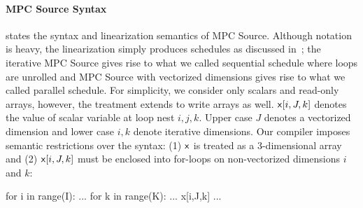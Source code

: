 \paragraph{MPC Source Syntax}

 states the syntax and linearization semantics of MPC Source. 
Although notation is heavy, the linearization simply produces schedules as discussed in~; 
the iterative MPC Source gives rise to what we called sequential schedule where loops are unrolled 
and MPC Source with vectorized dimensions gives rise to what we called parallel schedule. 
For simplicity, we consider only scalars and read-only arrays, however, the treatment extends to write arrays as well.
${\sf {x}}[i,J,k]$ denotes the value of scalar variable \x{} at loop nest $i,j,k$. 
Upper case $J$ denotes a vectorized dimension and lower case $i,k$ denote iterative dimensions. Our compiler imposes 
semantic restrictions over the syntax: (1) ${\sf {x}}$ is treated as a 3-dimensional array and (2) ${\sf {x}}[i,J,k]$ must be enclosed
into for-loops on non-vectorized dimensions $i$ and $k$:
\begin{pythonn}
for i in range(I):
   ...
   for k in range(K):
      ... x[i,J,k] ...
\end{pythonn}


